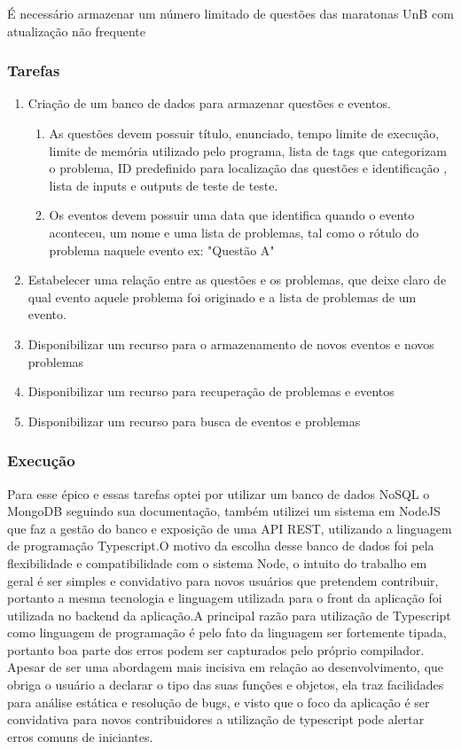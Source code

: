 É necessário armazenar um número limitado de questões das maratonas UnB com atualização não frequente

\subsubsection{Tarefas}

\begin{enumerate}
    \item Criação de um banco de dados para armazenar questões e eventos.
          \begin{enumerate}
              \item As questões devem possuir título, enunciado, tempo limite de execução, limite de memória utilizado pelo programa, lista de tags que categorizam o problema, ID predefinido para localização das questões e identificação , lista de inputs e outputs de teste de teste.
              \item Os eventos devem possuir uma data que identifica quando o evento aconteceu, um nome e uma lista de problemas, tal como o rótulo do problema naquele evento ex: "Questão A"
          \end{enumerate}
    \item Estabelecer uma relação entre as questões e os problemas, que deixe claro de qual evento aquele problema foi originado e a lista de problemas de um evento.
    \item Disponibilizar um recurso para o armazenamento de novos eventos e novos problemas
    \item Disponibilizar um recurso para recuperação de problemas e eventos
    \item Disponibilizar um recurso para busca de eventos e problemas
\end{enumerate}



\subsubsection{Execução}

Para esse épico e essas tarefas optei por utilizar um banco de dados NoSQL o MongoDB seguindo sua documentação, também utilizei um sistema em NodeJS que faz a gestão do banco e exposição de uma API REST, utilizando a linguagem de programação Typescript.O motivo da escolha desse banco de dados foi pela flexibilidade e compatibilidade com o sistema Node, o intuito do trabalho em geral é ser simples e convidativo para novos usuários que pretendem contribuir, portanto a mesma tecnologia e linguagem utilizada para o front da aplicação foi utilizada no backend da aplicação.A principal razão para utilização de Typescript como linguagem de programação é pelo fato da linguagem ser fortemente tipada, portanto boa parte dos erros podem ser capturados pelo próprio compilador. Apesar de ser uma abordagem mais incisiva em relação ao desenvolvimento, que obriga o usuário a declarar o tipo das suas funções e objetos, ela traz facilidades para análise estática e resolução de bugs, e visto que o foco da aplicação é ser convidativa para novos contribuidores a utilização de typescript pode alertar erros comuns de iniciantes.

